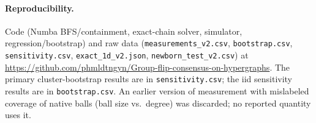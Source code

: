 \documentclass[preprint,12pt]{elsarticle}
\begin{document}
\paragraph{Reproducibility.}
Code (Numba BFS/containment, exact-chain solver, simulator,
regression/bootstrap) and raw data
(\texttt{measurements\_v2.csv}, \texttt{bootstrap.csv},
\texttt{sensitivity.csv}, \texttt{exact\_1d\_v2.json},
\texttt{newborn\_test\_v2.csv}) at
\url{https://github.com/phmldtngyn/Group-flip-consensus-on-hypergraphs}.
The primary cluster-bootstrap results are in \texttt{sensitivity.csv};
the iid sensitivity results are in \texttt{bootstrap.csv}. An earlier
version of measurement with mislabeled coverage of native balls (ball
size vs.\ degree) was discarded; no reported quantity uses it.
\end{document}
